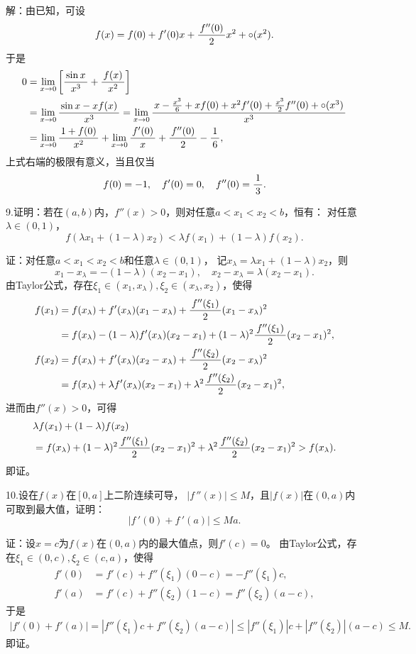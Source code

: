 解：由已知，可设
$$f(x)=f(0)+f'(0)x+\displaystyle\frac{\,{f''(0)}\,}{\,{2}\,}x^2+\circ(x^2).$$
于是
\begin{align*}
	0&=\lim\limits_{x\to{0}}\left[\displaystyle\frac{\,{\sin x}\,}{\,{x^3}\,}+\displaystyle\frac{\,{f(x)}\,}{\,{x^2}\,}\right]\\
	&=\lim\limits_{x\to{0}}\displaystyle\frac{\,{\sin x-xf(x)}\,}{\,{x^3}\,}
	=\lim\limits_{x\to{0}}\displaystyle\frac{\,{x-\frac{x^3}6+xf(0)+x^2f'(0)+\frac{x^3}2f''(0)+\circ(x^3)}\,}{\,{x^3}\,}\\
	&=\lim\limits_{x\to{0}}\displaystyle\frac{\,{1+f(0)}\,}{\,{x^2}\,}+\lim\limits_{x\to{0}}\displaystyle\frac{\,{f'(0)}\,}{\,{x}\,}+\displaystyle\frac{\,{f''(0)}\,}{\,{2}\,}-\displaystyle\frac{\,{1}\,}{\,{6}\,},
\end{align*}
上式右端的极限有意义，当且仅当
$$f(0)=-1,\quad f'(0)=0,\quad f''(0)=\displaystyle\frac{\,{1}\,}{\,{3}\,}.$$
\fin

\bigskip

9.证明：若在$(a,b)$内，$f''(x)>0$，则对任意$a<x_1<x_2<b$，恒有：
对任意$\lambda\in(0,1)$，
$$f(\lambda x_1+(1-\lambda)x_2)<\lambda
f(x_1)+(1-\lambda)f(x_2).$$

证：对任意$a<x_1<x_2<b$和任意$\lambda\in(0,1)$，
记$x_{\lambda}=\lambda x_1+(1-\lambda)x_2$，则
$$x_1-x_{\lambda}=-(1-\lambda)(x_2-x_1),\quad
x_2-x_{\lambda}=\lambda(x_2-x_1).$$
由Taylor公式，存在$\xi_1\in(x_1,x_{\lambda}),
\xi_2\in(x_{\lambda},x_2)$，使得
\begin{align*}
	f(x_1)&=f(x_{\lambda})+f'(x_{\lambda})(x_1-x_{\lambda})
	+\displaystyle\frac{\,{f''(\xi_1)}\,}{\,{2}\,}(x_1-x_{\lambda})^2\\
	&=f(x_{\lambda})-(1-\lambda)f'(x_{\lambda})(x_2-x_1)
	+(1-\lambda)^2\displaystyle\frac{\,{f''(\xi_1)}\,}{\,{2}\,}(x_2-x_1)^2,\\
	f(x_2)&=f(x_{\lambda})+f'(x_{\lambda})(x_2-x_{\lambda})
	+\displaystyle\frac{\,{f''(\xi_2)}\,}{\,{2}\,}(x_2-x_{\lambda})^2\\
	&=f(x_{\lambda})+\lambda f'(x_{\lambda})(x_2-x_1)
	+\lambda^2\displaystyle\frac{\,{f''(\xi_2)}\,}{\,{2}\,}(x_2-x_1)^2,
\end{align*}
进而由$f''(x)>0$，可得
\begin{align*}
	&\lambda f(x_1)+(1-\lambda)f(x_2)\\
	&=f(x_{\lambda})+(1-\lambda)^2\displaystyle\frac{\,{f''(\xi_1)}\,}{\,{2}\,}(x_2-x_1)^2
	+\lambda^2\displaystyle\frac{\,{f''(\xi_2)}\,}{\,{2}\,}(x_2-x_1)^2>f(x_{\lambda}).
\end{align*}
即证。
\fin

\bigskip

10.设在$f(x)$在$[0,a]$上二阶连续可导，
$|f\,''(x)|\leq M$，且$|f(x)|$在$(0,a)$内可取到最大值，证明：
$$|f\,'(0)+f\,'(a)|\leq Ma.$$	

证：设$x=c$为$f(x)$在$(0,a)$内的最大值点，则$f'(c)=0$。
由Taylor公式，存在$\xi_1\in(0,c),\xi_2\in(c,a)$，使得
\begin{align*}
	f'(0)&=f'(c)+f''(\xi_1)(0-c)=-f''(\xi_1)c,\\
	f'(a)&=f'(c)+f''(\xi_2)(1-c)=f''(\xi_2)(a-c),
\end{align*}
于是
\begin{align*}
	|f'(0)+f'(a)|=|f''(\xi_1)c+f''(\xi_2)(a-c)|
	\leq|f''(\xi_1)|c+|f''(\xi_2)|(a-c)\leq M.
\end{align*}
即证。\fin

